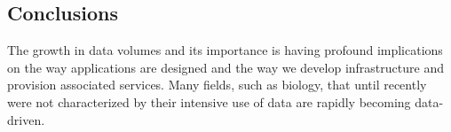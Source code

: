 






\subsection{Conclusions}
\label{sec:conclusion}

The growth in data volumes and its importance is having profound implications on
the way applications are designed and the way we develop infrastructure and
provision associated services.  Many fields, such as biology, that until
recently were not characterized by their intensive use of data are rapidly
becoming data-driven.


